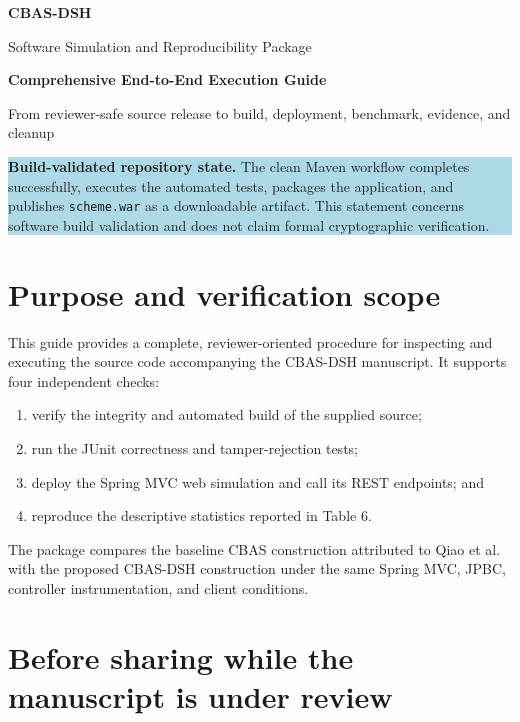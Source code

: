 \documentclass[11pt,a4paper]{article}
\newcommand{\statusbox}[1]{%
  \begingroup\setlength{\fboxsep}{8pt}%
  \colorbox{lightblue}{\parbox{0.94\linewidth}{#1}}%
  \endgroup
}
\begin{document}
\begin{center}
  {\color{navy}\Huge\bfseries CBAS-DSH}\par
  \vspace{2mm}
  {\Large Software Simulation and Reproducibility Package}\par
  \vspace{4mm}
  {\LARGE\bfseries Comprehensive End-to-End Execution Guide}\par
  \vspace{5mm}
  {\large From reviewer-safe source release to build, deployment, benchmark, evidence, and cleanup}
\end{center}

\vspace{3mm}
\statusbox{\textbf{Build-validated repository state.} The clean Maven workflow completes successfully, executes the automated tests, packages the application, and publishes \texttt{scheme.war} as a downloadable artifact. This statement concerns software build validation and does not claim formal cryptographic verification.}

\tableofcontents
\newpage

\section{Purpose and verification scope}

This guide provides a complete, reviewer-oriented procedure for inspecting and executing the source code accompanying the CBAS-DSH manuscript. It supports four independent checks:

\begin{enumerate}
  \item verify the integrity and automated build of the supplied source;
  \item run the JUnit correctness and tamper-rejection tests;
  \item deploy the Spring MVC web simulation and call its REST endpoints; and
  \item reproduce the descriptive statistics reported in Table 6.
\end{enumerate}

The package compares the baseline CBAS construction attributed to Qiao et al. with the proposed CBAS-DSH construction under the same Spring MVC, JPBC, controller instrumentation, and client conditions.

\section{Before sharing while the manuscript is under review}
\end{document}
